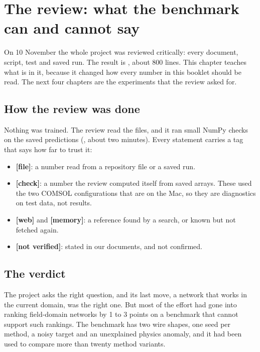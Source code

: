 \chapter{The review: what the benchmark can and cannot say}\label{ch:review}

On 10 November the whole project was reviewed critically: every document, script, test and saved run. The result is
, about 800 lines. This chapter teaches what is in it, because it changed how every number in
this booklet should be read. The next four chapters are the experiments that the review asked for.

\section{How the review was done}

Nothing was trained. The review read the files, and it ran small NumPy checks on the saved predictions
(, about two minutes). Every statement carries a tag that says how far to trust it:
\begin{itemize}
\item \textbf{[file]}: a number read from a repository file or a saved run.
\item \textbf{[check]}: a number the review computed itself from saved arrays. These used the two COMSOL configurations
that are on the Mac, so they are diagnostics on test data, not results.
\item \textbf{[web]} and \textbf{[memory]}: a reference found by a search, or known but not fetched again.
\item \textbf{[not verified]}: stated in our documents, and not confirmed.
\end{itemize}

\section{The verdict}

\begin{keyidea}
The project asks the right question, and its last move, a network that works in the current domain, was the right one.
But most of the effort had gone into ranking field-domain networks by 1 to 3 points on a benchmark that cannot support
such rankings. The benchmark has two wire shapes, one seed per method, a noisy target and an unexplained physics
anomaly, and it had been used to compare more than twenty method variants.
\end{keyidea}

